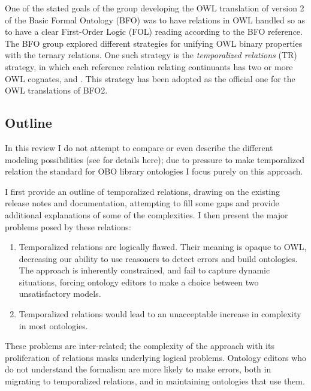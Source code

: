 \documentclass{bioinfo}
\begin{document}
One of the stated goals of the group developing the OWL translation of
version 2 of the Basic Formal Ontology (BFO)\cite{Grenon2004} was to
have relations in OWL handled so as to have a clear First-Order Logic
(FOL) reading according to the BFO reference\cite{BFO2Ref}. The BFO
group explored different strategies for unifying OWL binary properties
with the ternary relations\cite{Grewe}.  One such strategy is the
\emph{temporalized relations} (TR) strategy, in which each reference
relation relating continuants has two or more OWL cognates,
 and . This strategy has
been adopted as the official one for the OWL translations of
BFO2\cite{Graz}.

\subsection{Outline}

In this review I do not attempt to compare or even describe the
different modeling possibilities (see \cite{Grewe} for details here);
due to pressure to make temporalized relation the standard for OBO
library ontologies I focus purely on this approach.

I first provide an outline of temporalized relations, drawing on the
existing release notes and documentation, attempting to fill some gaps
and provide additional explanations of some of the complexities. I
then present the major problems posed by these relations:

\begin{enumerate}

\item Temporalized relations are logically flawed. Their meaning is
  opaque to OWL, decreasing our ability to use reasoners to detect
  errors and build ontologies. The approach is inherently constrained,
  and fail to capture dynamic situations, forcing ontology editors to
  make a choice between two unsatisfactory models. 

\item Temporalized relations would lead to an unacceptable increase in
  complexity in most ontologies.

\end{enumerate}

These problems are inter-related; the complexity of the approach with
its proliferation of relations masks underlying logical
problems. Ontology editors who do not understand the formalism are
more likely to make errors, both in migrating to temporalized
relations, and in maintaining ontologies that use them.
\end{document}
